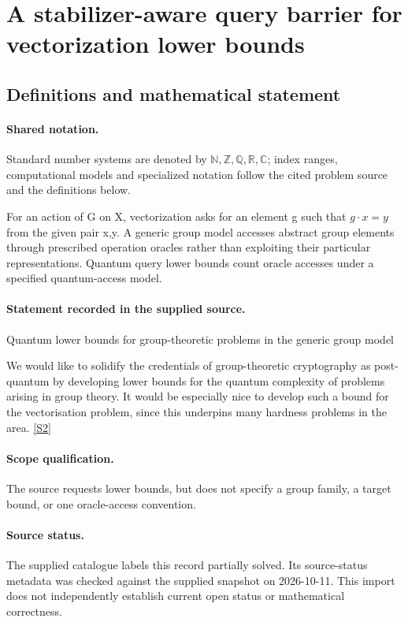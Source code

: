 \documentclass[11pt]{article}
\newcommand{\sref}[2]{\hyperlink{source:#1:#2}{[S#2]}}
\begin{document}
\section{A stabilizer-aware query barrier for vectorization lower bounds}\label{statement}

\subsection{Definitions and mathematical statement}

\paragraph{Shared notation.}Standard number systems are denoted by $\mathbb N,\mathbb Z,\mathbb Q,\mathbb R,\mathbb C$; index ranges, computational models and specialized notation follow the cited problem source and the definitions below.


For an action of G on X, vectorization asks for an element g such that $g\cdot x=y$ from the given pair x,y. A generic group model accesses abstract group elements through prescribed operation oracles rather than exploiting their particular representations. Quantum query lower bounds count oracle accesses under a specified quantum-access model.
\paragraph{Statement recorded in the supplied source.}
Quantum lower bounds for group-theoretic problems in the generic group model

We would like to solidify the credentials of group-theoretic cryptography as post-quantum by developing lower bounds for the quantum complexity of problems arising in group theory. It would be especially nice to develop such a bound for the vectorisation problem, since this underpins many hardness problems in the area. \sref{statement}{2}
\paragraph{Scope qualification.}
The source requests lower bounds, but does not specify a group family, a target bound, or one oracle-access convention.
\paragraph{Source status.}
The supplied catalogue labels this record partially solved. Its source-status metadata was checked against the supplied snapshot on 2026-10-11. This import does not independently establish current open status or mathematical correctness.
\end{document}
